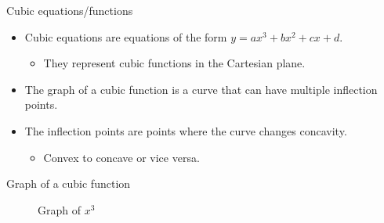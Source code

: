 \documentclass[
  10pt,
  ignorenonframetext,
]{beamer}
\providecommand{\tightlist}{%
  \setlength{\itemsep}{0pt}\setlength{\parskip}{0pt}}\usepackage{longtable,booktabs,array}
\begin{document}
\begin{frame}{Cubic equations/functions}
\label{cubic-equationsfunctions}
\begin{itemize}
\item
  Cubic equations are equations of the form
  \(y = ax^3 + bx^2 + cx + d\).

  \begin{itemize}
  \tightlist
  \item
    They represent cubic functions in the Cartesian plane.
  \end{itemize}
\item
  The graph of a cubic function is a curve that can have multiple
  inflection points.
\item
  The inflection points are points where the curve changes concavity.

  \begin{itemize}
  \tightlist
  \item
    Convex to concave or vice versa.
  \end{itemize}
\end{itemize}
\end{frame}

\begin{frame}{Graph of a cubic function}
\label{graph-of-a-cubic-function}
\begin{figure}
\centering
{}
\caption{Graph of $x^3$}
\end{figure}
\end{frame}
\end{document}
